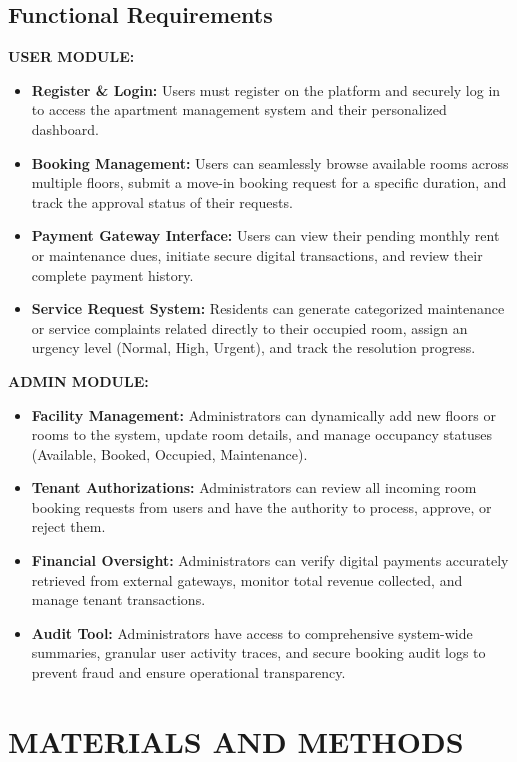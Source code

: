 \documentclass[12pt,a4paper]{report}
\begin{document}
\section{Functional Requirements}
\textbf{USER MODULE:}
\begin{itemize}
    \item \textbf{Register \& Login:} Users must register on the platform and securely log in to access the apartment management system and their personalized dashboard.
    \item \textbf{Booking Management:} Users can seamlessly browse available rooms across multiple floors, submit a move-in booking request for a specific duration, and track the approval status of their requests.
    \item \textbf{Payment Gateway Interface:} Users can view their pending monthly rent or maintenance dues, initiate secure digital transactions, and review their complete payment history.
    \item \textbf{Service Request System:} Residents can generate categorized maintenance or service complaints related directly to their occupied room, assign an urgency level (Normal, High, Urgent), and track the resolution progress.
\end{itemize}

\textbf{ADMIN MODULE:}
\begin{itemize}
    \item \textbf{Facility Management:} Administrators can dynamically add new floors or rooms to the system, update room details, and manage occupancy statuses (Available, Booked, Occupied, Maintenance).
    \item \textbf{Tenant Authorizations:} Administrators can review all incoming room booking requests from users and have the authority to process, approve, or reject them.
    \item \textbf{Financial Oversight:} Administrators can verify digital payments accurately retrieved from external gateways, monitor total revenue collected, and manage tenant transactions.
    \item \textbf{Audit Tool:} Administrators have access to comprehensive system-wide summaries, granular user activity traces, and secure booking audit logs to prevent fraud and ensure operational transparency.
\end{itemize}

\chapter{MATERIALS AND METHODS}
\end{document}
